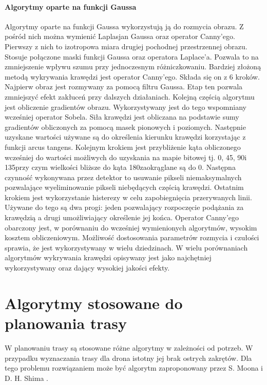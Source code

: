 \paragraph{Algorytmy oparte na funkcji Gaussa}

Algorytmy oparte na funkcji Gaussa wykorzystują ją do rozmycia obrazu. Z pośród nich można wymienić Laplasjan Gaussa oraz operator Canny'ego. Pierwszy z nich to izotropowa miara drugiej pochodnej przestrzennej obrazu. Stosuje połączone maski funkcji Gaussa oraz operatora Laplace'a\cite{raman_et_al_study_and_comparison}. Pozwala to na zmniejszenie wpływu szumu przy jednoczesnym różniczkowaniu. Bardziej złożoną metodą wykrywania krawędzi jest operator Canny'ego. Składa się on z 6 kroków\cite{raman_et_al_study_and_comparison}. Najpierw obraz jest rozmywany za pomocą filtru Gaussa. Etap ten pozwala zmniejszyć efekt zakłuceń przy dalszych działaniach. Kolejną częścią algorytmu jest obliczenie gradientów obrazu. Wykorzystywany jest do tego wspomniany wcześniej operator Sobela. Siła krawędzi jest obliczana na podstawie sumy gradientów obliczonych za pomocą masek pionowych i poziomych. Następnie uzyskane wartości używane są do określenia kierunku krawędzi korzystając z funkcji arcus tangens. Kolejnym krokiem jest przybliżenie kąta obliczonego wcześniej do wartości możliwych do uzyskania na mapie bitowej tj. 0\textdegree, 45\textdegree, 90\textdegree i 135\textdegree przy czym wielkości bliższe do kąta 180\textdegree zaokrąglane są do 0\textdegree. Następna czynność wykonywana przez detektor to usuwanie pikseli niemaksymalnych pozwalające wyeliminowanie pikseli niebędących częścią krawędzi. Ostatnim krokiem jest wykorzystanie histerezy w celu zapobiegnięcia przerywanych linii. Używane do tego są dwa progi: jeden pozwalający rozpoczęcie podążania za krawędzią a drugi umożliwiający określenie jej końca. Operator Canny'ego obarczony jest, w porównaniu do wcześniej wymienionych algorytmów, wysokim kosztem obliczeniowym. Możliwość dostosowania parametrów rozmycia i czułości sprawia, że jest wykorzystywany w wielu dziedzinach. W wielu porównaniach algorytmów wykrywania krawędzi opisywany jest jako najchętniej wykorzystywany oraz dający wysokiej jakości efekty.\cite{raman_et_al_study_and_comparison}\cite{survey_on_edge_detection}

\section{Algorytmy stosowane do planowania trasy}

W planowaniu trasy są stosowane różne algorytmy w zależności od potrzeb. W przypadku wyznaczania trasy dla drona istotny jej brak ostrych zakrętów. Dla tego problemu rozwiązaniem może być algorytm zaproponowany przez S. Moona i D. H. Shima \cite{path_planning_uav}.